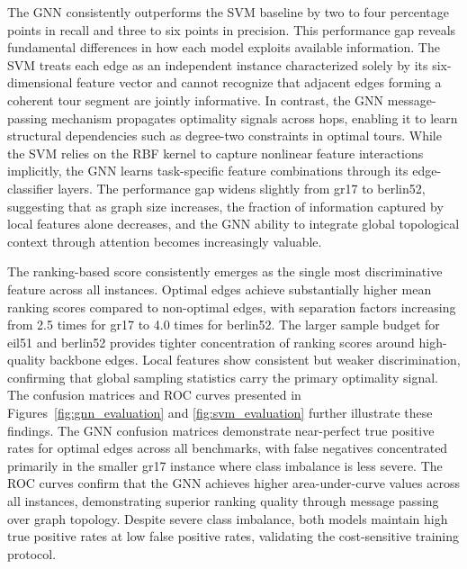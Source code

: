 \documentclass[twoside]{article}
\begin{document}
	

	 The GNN consistently outperforms the SVM baseline by two to four percentage points in recall and three to six points in precision. This performance gap reveals fundamental differences in how each model exploits available information. The SVM treats each edge as an independent instance characterized solely by its six-dimensional feature vector and cannot recognize that adjacent edges forming a coherent tour segment are jointly informative. In contrast, the GNN message-passing mechanism propagates optimality signals across hops, enabling it to learn structural dependencies such as degree-two constraints in optimal tours. While the SVM relies on the RBF kernel to capture nonlinear feature interactions implicitly, the GNN learns task-specific feature combinations through its edge-classifier layers. The performance gap widens slightly from gr17 to berlin52, suggesting that as graph size increases, the fraction of information captured by local features alone decreases, and the GNN ability to integrate global topological context through attention becomes increasingly valuable.	

	

	The ranking-based score consistently emerges as the single most discriminative feature across all instances. Optimal edges achieve substantially higher mean ranking scores compared to non-optimal edges, with separation factors increasing from 2.5 times for gr17 to 4.0 times for berlin52. The larger sample budget for eil51 and berlin52 provides tighter concentration of ranking scores around high-quality backbone edges. Local features show consistent but weaker discrimination, confirming that global sampling statistics carry the primary optimality signal. The confusion matrices and ROC curves presented in Figures~\ref{fig:gnn_evaluation} and \ref{fig:svm_evaluation} further illustrate these findings. The GNN confusion matrices demonstrate near-perfect true positive rates for optimal edges across all benchmarks, with false negatives concentrated primarily in the smaller gr17 instance where class imbalance is less severe. The ROC curves confirm that the GNN achieves higher area-under-curve values across all instances, demonstrating superior ranking quality through message passing over graph topology. Despite severe class imbalance, both models maintain high true positive rates at low false positive rates, validating the cost-sensitive training protocol.

	
\end{document}
